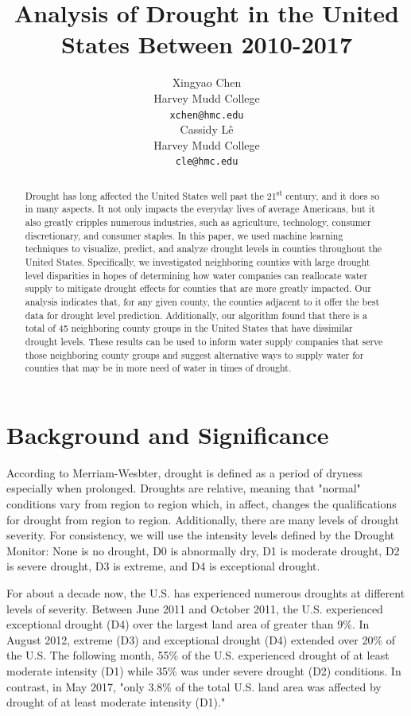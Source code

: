 \documentclass{article}
\title{Analysis of Drought in the United States Between 2010-2017}
\author{%
  Xingyao Chen\\
  Harvey Mudd College\\
  \texttt{xchen@hmc.edu} \\
  \And
  Cassidy L\^e\\
  Harvey Mudd College\\
  \texttt{cle@hmc.edu} \\
}
\begin{document}
\maketitle

\begin{abstract}
  Drought has long affected the United States well past the 21\textsuperscript{st} century, and it does so in many aspects. It not only impacts the everyday lives of average Americans, but it also greatly cripples numerous industries, such as agriculture, technology, consumer discretionary, and consumer staples. In this paper, we used machine learning techniques to visualize, predict, and analyze drought levels in counties throughout the United States. Specifically, we investigated neighboring counties with large drought level disparities in hopes of determining how water companies can reallocate water supply to mitigate drought effects for counties that are more greatly impacted. Our analysis indicates that, for any given county, the counties adjacent to it offer the best data for drought level prediction. Additionally, our algorithm found that there is a total of 45 neighboring county groups in the United States that have dissimilar drought levels. These results can be used to inform water supply companies that serve those neighboring county groups and suggest alternative ways to supply water for counties that may be in more need of water in times of drought.
\end{abstract}

\section{Background and Significance}
According to Merriam-Wesbter, drought is defined as a period of dryness especially when prolonged. Droughts are relative, meaning that "normal" conditions vary from region to region which, in affect, changes the qualifications for drought from region to region. Additionally, there are many levels of drought severity. For consistency, we will use the intensity levels defined by the Drought Monitor: None is no drought, D0 is abnormally dry, D1 is moderate drought, D2 is severe drought, D3 is extreme, and D4 is exceptional drought.

For about a decade now, the U.S. has experienced numerous droughts at different levels of severity. Between June 2011 and October 2011, the U.S. experienced exceptional drought (D4) over the largest land area of greater than 9\%. In August 2012, extreme (D3) and exceptional drought (D4) extended over 20\% of the U.S. The following month, 55\% of the U.S. experienced drought of at least moderate intensity (D1) while 35\% was under severe drought (D2) conditions. In contrast, in May 2017, "only 3.8\% of the total U.S. land area was affected by drought of at least moderate intensity (D1)." \cite{Folger:2017jd}
\end{document}
